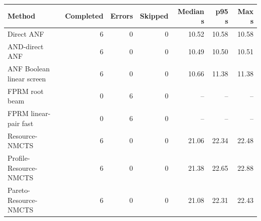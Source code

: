 \begin{tabular}{lrrrrrr}
\toprule
Method & Completed & Errors & Skipped & Median s & p95 s & Max s \\
\midrule
Direct ANF & 6 & 0 & 0 & 10.52 & 10.58 & 10.58 \\
AND-direct ANF & 6 & 0 & 0 & 10.49 & 10.50 & 10.51 \\
ANF Boolean linear screen & 6 & 0 & 0 & 10.66 & 11.38 & 11.38 \\
FPRM root beam & 0 & 6 & 0 & -- & -- & -- \\
FPRM linear-pair fast & 0 & 6 & 0 & -- & -- & -- \\
Resource-NMCTS & 6 & 0 & 0 & 21.06 & 22.34 & 22.48 \\
Profile-Resource-NMCTS & 6 & 0 & 0 & 21.38 & 22.65 & 22.88 \\
Pareto-Resource-NMCTS & 6 & 0 & 0 & 21.08 & 22.31 & 22.43 \\
\bottomrule
\end{tabular}
